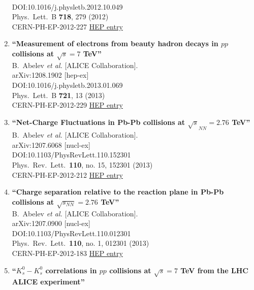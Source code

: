 \begin{enumerate}
  \\{}DOI:10.1016/j.physletb.2012.10.049
  \\{}Phys.\ Lett.\ B {\bf 718}, 279 (2012)
  \\{}CERN-PH-EP-2012-227
\href{http://inspirehep.net/record/1126963}{HEP entry}
\item%
{\bf ``Measurement of electrons from beauty hadron decays in $pp$ collisions at $\sqrt{s}=7$ TeV''}
  \\{}B.~Abelev {\it et al.} [ALICE Collaboration].
  \\{}arXiv:1208.1902 [hep-ex]
  \\{}DOI:10.1016/j.physletb.2013.01.069
  \\{}Phys.\ Lett.\ B {\bf 721}, 13 (2013)
  \\{}CERN-PH-EP-2012-229
\href{http://inspirehep.net/record/1126962}{HEP entry}
\item%
{\bf ``Net-Charge Fluctuations in Pb-Pb collisions at $\sqrt{s}_{NN} = 2.76$ TeV''}
  \\{}B.~Abelev {\it et al.} [ALICE Collaboration].
  \\{}arXiv:1207.6068 [nucl-ex]
  \\{}DOI:10.1103/PhysRevLett.110.152301
  \\{}Phys.\ Rev.\ Lett.\  {\bf 110}, no. 15, 152301 (2013)
  \\{}CERN-PH-EP-2012-212
\href{http://inspirehep.net/record/1123802}{HEP entry}
\item%
{\bf ``Charge separation relative to the reaction plane in Pb-Pb collisions at $\sqrt{s_{NN}}= 2.76$ TeV''}
  \\{}B.~Abelev {\it et al.} [ALICE Collaboration].
  \\{}arXiv:1207.0900 [nucl-ex]
  \\{}DOI:10.1103/PhysRevLett.110.012301
  \\{}Phys.\ Rev.\ Lett.\  {\bf 110}, no. 1, 012301 (2013)
  \\{}CERN-PH-EP-2012-183
\href{http://inspirehep.net/record/1121161}{HEP entry}
\item%
{\bf ``$K^0_s-K^0_s$ correlations in $pp$ collisions at $\sqrt{s}=7$ TeV from the LHC ALICE experiment''}

\end{enumerate}
